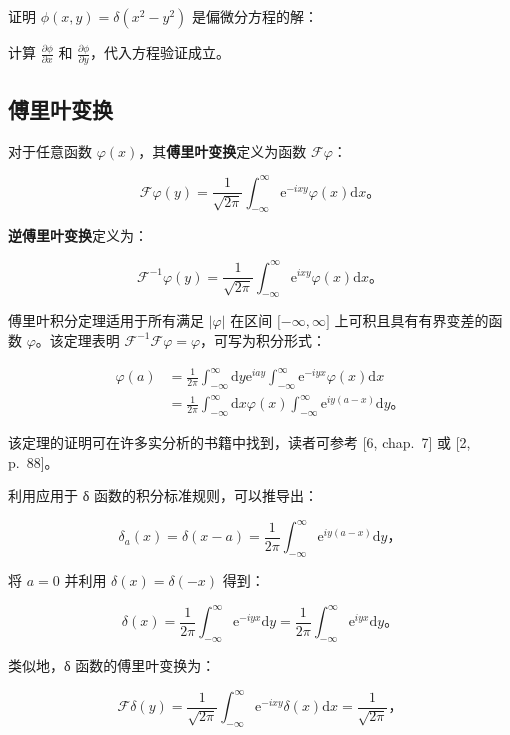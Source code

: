 证明 \(\phi(x,y) = \delta\left( x^{2} - y^{2} \right)\)
是偏微分方程的解：

计算 \(\frac{\partial\phi}{\partial x}\) 和
\(\frac{\partial\phi}{\partial y}\)，代入方程验证成立。

\subsection{傅里叶变换}\label{ux5085ux91ccux53f6ux53d8ux6362}

对于任意函数 \(\varphi(x)\)，其\textbf{傅里叶变换}定义为函数
\(\mathcal{F}\varphi\)：

\[\mathcal{F}\varphi(y) = \frac{1}{\sqrt{2\pi}}\int_{- \infty}^{\infty}\mathrm{e}^{- ixy}\varphi(x)\mathrm{d}x。\]

\textbf{逆傅里叶变换}定义为：

\[\mathcal{F}^{- 1}\varphi(y) = \frac{1}{\sqrt{2\pi}}\int_{- \infty}^{\infty}\mathrm{e}^{ixy}\varphi(x)\mathrm{d}x。\]

傅里叶积分定理适用于所有满足 \(|\varphi|\) 在区间
\(\lbrack - \infty,\infty\rbrack\) 上可积且具有有界变差的函数
\(\varphi\)。该定理表明
\(\mathcal{F}^{- 1}\mathcal{F}\varphi = \varphi\)，可写为积分形式：

\[\begin{aligned}
\varphi(a) & = \frac{1}{2\pi}\int_{- \infty}^{\infty}\mathrm{d}y\mathrm{e}^{iay}\int_{- \infty}^{\infty}\mathrm{e}^{- iyx}\varphi(x)\mathrm{d}x \\
 & = \frac{1}{2\pi}\int_{- \infty}^{\infty}\mathrm{d}x\varphi(x)\int_{- \infty}^{\infty}\mathrm{e}^{iy(a - x)}\mathrm{d}y。
\end{aligned}\]

该定理的证明可在许多实分析的书籍中找到，读者可参考 {[}6, chap.~7{]} 或
{[}2, p.~88{]}。

利用应用于 δ 函数的积分标准规则，可以推导出：

\[\delta_{a}(x) = \delta(x - a) = \frac{1}{2\pi}\int_{- \infty}^{\infty}\mathrm{e}^{iy(a - x)}\mathrm{d}y，\]

将 \(a = 0\) 并利用 \(\delta(x) = \delta( - x)\) 得到：

\[\delta(x) = \frac{1}{2\pi}\int_{- \infty}^{\infty}\mathrm{e}^{- iyx}\mathrm{d}y = \frac{1}{2\pi}\int_{- \infty}^{\infty}\mathrm{e}^{iyx}\mathrm{d}y。\]

类似地，δ 函数的傅里叶变换为：

\[\mathcal{F}\delta(y) = \frac{1}{\sqrt{2\pi}}\int_{- \infty}^{\infty}\mathrm{e}^{- ixy}\delta(x)\mathrm{d}x = \frac{1}{\sqrt{2\pi}}，\]

